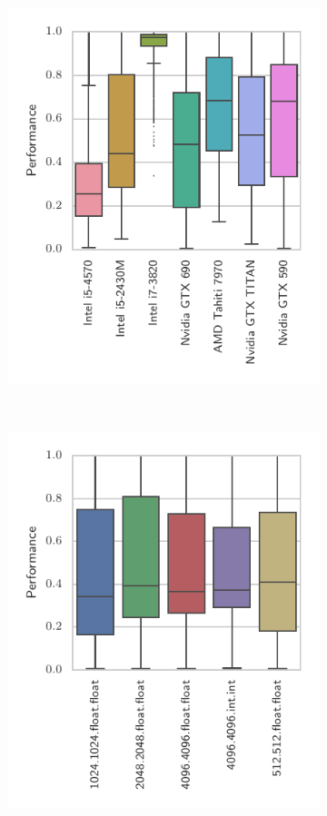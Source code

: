 \documentclass[nonatbib,preprint,nocopyrightspace,9pt]{sigplanconf}
\begin{document}
\begin{figure}
\begin{subfigure}[h]{.48\columnwidth}
    \includegraphics[width=\columnwidth]{img/performance_devices.pdf}
    \vspace{-1.5em} %
    \caption{}
    \label{fig:performance-devices}
  \end{subfigure}
  ~%
  \begin{subfigure}[h]{.48\columnwidth}
    \centering
    \includegraphics[width=\columnwidth]{img/performance_datasets.pdf}

\end{subfigure}
\end{figure}
\end{document}
